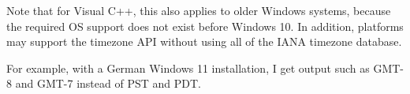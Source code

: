 Note that for Visual C++, this also applies to older Windows systems, because the required OS support does not exist before Windows 10.
In addition, platforms may support the timezone API without using all of the IANA timezone database.

For example, with a German Windows 11 installation, I get output such as GMT-8 and GMT-7 instead of PST and PDT.















